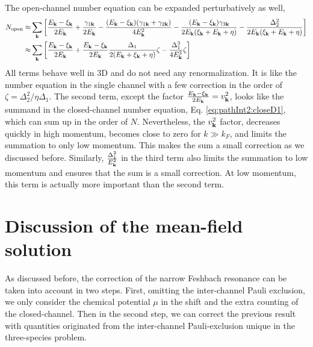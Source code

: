 \begin{unsure}
The open-channel number equation  can be expanded perturbatively as well, 
\begin{equation}\label{eq:pathInt2:openNum}
\begin{split}
N_{\text{open}}\approx&\sum_{\mathbf{k}}\left[\frac{E_{\mathbf{k}}-\xi_{\mathbf{k}}}{2E_{\mathbf{k}}}+\frac{\gamma_{1\mathbf{k}}}{2E_{\mathbf{k}}}
	-\frac{(E_{\mathbf{k}}-\xi_{\mathbf{k}})(\gamma_{1\mathbf{k}}+\gamma_{2\mathbf{k}})}{4E_{\mathbf{k}}^2}
	-\frac{(E_{\mathbf{k}}-\xi_{\mathbf{k}})\gamma_{3\mathbf{k}}}{2E_{\mathbf{k}}(\xi_{\mathbf{k}}+E_{\mathbf{k}}+\eta)}
	-\frac{\Delta_{2}^{2}}{2E_{\mathbf{k}}(\xi_{\mathbf{k}}+E_{\mathbf{k}}+\eta)}\right]\\
	\approx&\sum_{\mathbf{k}}\left[\frac{E_{\mathbf{k}}-\xi_{\mathbf{k}}}{2E_{\mathbf{k}}}+\frac{E_{\mathbf{k}}-\xi_{\mathbf{k}}}{2E_{\mathbf{k}}}\frac{\Delta_{1}}{2(E_{\mathbf{k}}+\xi_{\mathbf{k}}+\eta)}\zeta -\frac{\Delta_{1}^{3}}{4E_{\mathbf{k}}^{3}}\zeta
	\right]	
\end{split}
\end{equation}
All terms behave well  in 3D and do not need any renormalization.   It is like the number equation in the single channel with  a few correction in the order of $\zeta=\Delta_2^2/\eta\Delta_{1}$.  The second term, except the factor $\frac{E_{\mathbf{k}}-\xi_{\mathbf{k}}}{2E_{\mathbf{k}}}=v_{\mathbf{k}}^{2}$, looks like the summand in the closed-channel number equation, Eq. \ref{eq:pathInt2:closeD1},  which can sum up in the order of $N$.  Nevertheless, the $v_{\mathbf{k}}^{2}$ factor, decreases quickly in high momentum, becomes close to zero for $k\gg{}k_{F}$, and limits the summation to only low momentum. This makes the sum  a small correction as we discussed before.    Similarly, $\frac{\Delta_{1}^{2}}{E_{\mathbf{k}}^{2}}$ in the third term also limits the summation to low momentum and ensures that the sum is a small correction. At low momentum, this term is actually more important than the second term. 



\section{Discussion of the mean-field solution\label{sec:pathInt2:mean2}}
As discussed before, the correction of the narrow Feshbach resonance can be taken into account in two steps.  First,  omitting the inter-channel Pauli exclusion, we only consider the chemical potential $\mu$ in the shift and  the extra counting of the closed-channel.  Then in the second step, we can correct the previous result with quantities originated from the inter-channel Pauli-exclusion unique in the three-species problem. 


\end{unsure}
